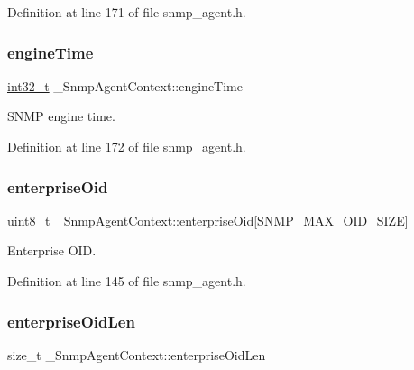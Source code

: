 Definition at line 171 of file snmp\+\_\+agent.\+h.

\mbox{\label{struct__SnmpAgentContext_a32903ce1a989d28902b103772ccc22ee}} 
\subsubsection{\texorpdfstring{engine\+Time}{engineTime}}
{\footnotesize\ttfamily \hyperlink{stdint_8h_ab1967d8591af1a4e48c37fd2b0f184d0}{int32\+\_\+t} \+\_\+\+Snmp\+Agent\+Context\+::engine\+Time}



S\+N\+MP engine time. 



Definition at line 172 of file snmp\+\_\+agent.\+h.

\mbox{\label{struct__SnmpAgentContext_ab8e41a5f50582ca2947bd0a4eb2b08f9}} 
\subsubsection{\texorpdfstring{enterprise\+Oid}{enterpriseOid}}
{\footnotesize\ttfamily \hyperlink{stdint_8h_aba7bc1797add20fe3efdf37ced1182c5}{uint8\+\_\+t} \+\_\+\+Snmp\+Agent\+Context\+::enterprise\+Oid\mbox{[}\hyperlink{snmp__common_8h_a7eee56441ee1b961702e8b4cbe9586a7}{S\+N\+M\+P\+\_\+\+M\+A\+X\+\_\+\+O\+I\+D\+\_\+\+S\+I\+ZE}\mbox{]}}



Enterprise O\+ID. 



Definition at line 145 of file snmp\+\_\+agent.\+h.

\mbox{\label{struct__SnmpAgentContext_a6f757ea4168b9684ff4c0c9d660ff179}} 
\subsubsection{\texorpdfstring{enterprise\+Oid\+Len}{enterpriseOidLen}}
{\footnotesize\ttfamily size\+\_\+t \+\_\+\+Snmp\+Agent\+Context\+::enterprise\+Oid\+Len}



